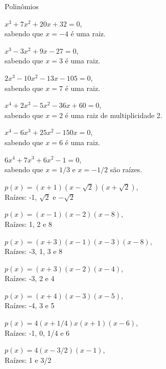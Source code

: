 \begin{exercicios}{Polinômios}
\begin{exercicio}
\begin{alphalist}
            \item $ x^3 +  7x^2 + 20x   + 32        = 0$, \\[1mm] sabendo que $x =  -4$              é uma raiz.
            \item $ x^3 -  3x^2 +  9x   - 27        = 0$, \\[1mm] sabendo que $x =   3$              é uma raiz.
            \item $2x^3 - 10x^2 - 13x   - 105       = 0$, \\[1mm] sabendo que $x =   7$              é uma raiz.
            \item $ x^4 +  2x^3 -  5x^2 - 36x + 60  = 0$, \\[1mm] sabendo que $x =   2$              é uma raiz de multiplicidade 2.
            \item $ x^4 -  6x^3 + 25x^2 - 150x      = 0$, \\[1mm] sabendo que $x =   6$              é uma raiz.
            \item $6x^4 +  7x^3 +  6x^2 - 1         = 0$, \\[1mm] sabendo que $x = 1/3$ e $x =-1/2$  são raízes.
        \end{alphalist}
        \begin{answers}
            \begin{alphalist}
                \item $p(x) = (x + 1)(x - \sqrt{2})(x + \sqrt{2})$,   \\[1mm] Raízes: -1, $\sqrt{2}$ e $-\sqrt{2}$        
                \item $p(x) = (x - 1)(x - 2)(x - 8)$,                 \\[1mm] Raízes: 1, 2 e 8
                \item $p(x) = (x + 3)(x - 1)(x - 3)(x - 8)$,          \\[1mm] Raízes: -3, 1, 3 e 8             
                \item $p(x) = (x + 3)(x - 2)(x - 4)$,                 \\[1mm] Raízes: -3, 2 e 4
                \item $p(x) = (x + 4)(x - 3)(x - 5)$,                 \\[1mm] Raízes: -4, 3 e 5
                \item $p(x) = 4(x + 1/4 )x(x + 1)(x - 6)$,            \\[1mm] Raízes: -1, 0, 1/4 e 6
                \item $p(x) = 4 (x - 3/2 ) (x - 1)$,                  \\[1mm] Raízes: 1 e 3/2

\end{alphalist}
\end{answers}
\end{exercicio}
\end{exercicios}
